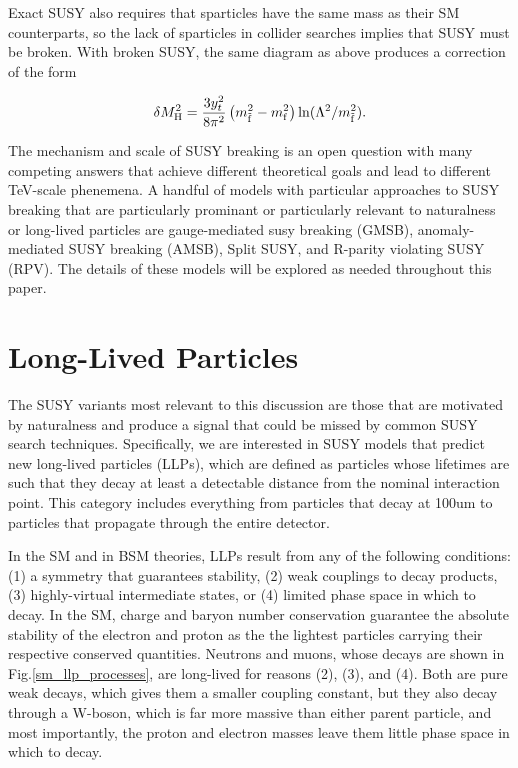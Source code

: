 \documentclass[12pt]{article}
\begin{document}
    Exact SUSY also requires that sparticles have the same mass as their SM counterparts, so the lack of sparticles in collider searches implies that SUSY must be broken. With broken SUSY, the same diagram as above produces a correction of the form~\cite{feng}  

    \noindent \begin{equation}
        \delta M_{\mathrm{H}}^2 = \frac{3y_t^2}{8\pi^2}\left(m_{\tilde{\mathrm{f}}}^2 - m_{\mathrm{f}}^2 \right)\ln(\Lambda^2/m_{\tilde{\mathrm{f}}}^2).
    \label{higgs_susy_correction}
    \end{equation}
    
    The mechanism and scale of SUSY breaking is an open question with many competing answers that achieve different theoretical goals and lead to different TeV-scale phenemena. A handful of models with particular approaches to SUSY breaking that are particularly prominant or particularly relevant to naturalness or long-lived particles are gauge-mediated susy breaking (GMSB), anomaly-mediated SUSY breaking (AMSB), Split SUSY, and R-parity violating SUSY (RPV). The details of these models will be explored as needed throughout this paper.

\section{Long-Lived Particles}
    The SUSY variants most relevant to this discussion are those that are motivated by naturalness and  produce a signal that could be missed by common SUSY search techniques. Specifically, we are interested in SUSY models that predict new long-lived particles (LLPs), which are defined as particles whose lifetimes are such that they decay at least a detectable distance from the nominal interaction point. This category includes everything from particles that decay at 100um to particles that propagate through the entire detector. 

    In the SM and in BSM theories, LLPs result from any of the following conditions: (1) a symmetry that guarantees stability, (2) weak couplings to decay products, (3) highly-virtual intermediate states, or (4) limited phase space in which to decay. In the SM, charge and baryon number conservation guarantee the absolute stability of the electron and proton as the the lightest particles carrying their respective conserved quantities. Neutrons and muons, whose decays are shown in Fig.\ref{sm_llp_processes}, are long-lived for reasons (2), (3), and (4). Both are pure weak decays, which gives them a smaller coupling constant, but they also decay through a W-boson, which is far more massive than either parent particle, and most importantly, the proton and electron masses leave them little phase space in which to decay. 
\end{document}
